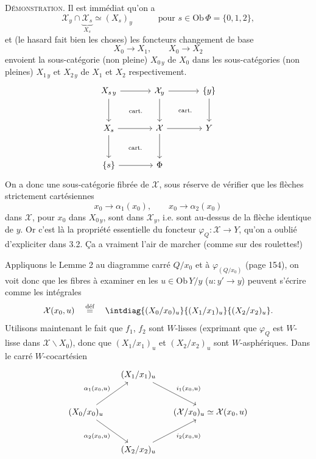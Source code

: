 \noindent\textsc{Démonstration.} Il est immédiat qu'on a
\[
\mathcal{X}_y\cap\underbrace{\mathcal{X}_s}_{X_s}\simeq(X_s)_y \qquad\quad \text{pour } s\in\mathrm{Ob}\,\Phi=\{0,1,2\},
\]
et (le hasard fait bien les choses) les foncteurs changement de base
\[
X_0\longrightarrow X_1, \qquad X_0\longrightarrow X_2
\]
envoient la sous-catégorie (non pleine) $X_{0\,y}$ de $X_0$ dans les sous-catégories (non pleines) $X_{1\,y}$ et $X_{2\,y}$ de $X_1$ et $X_2$ respectivement.
\[
\begin{tikzcd}[row sep=large,column sep=large]
X_{s\,y} \arrow[r] \arrow[d] \arrow[dr, phantom, "\scriptstyle\text{cart.}"] & \mathcal{X}_y \arrow[r] \arrow[d] \arrow[dr, phantom, "\scriptstyle\text{cart.}"] & \{y\} \arrow[d] \\
X_s \arrow[r] \arrow[d] \arrow[dr, phantom, "\scriptstyle\text{cart.}"] & \mathcal{X} \arrow[r] \arrow[d] & Y \\
\{s\} \arrow[r] & \Phi &
\end{tikzcd}
\]
On a donc une sous-catégorie fibrée de $\mathcal{X}$, sous réserve de vérifier que les flèches strictement cartésiennes
\[
x_0\longrightarrow\alpha_1(x_0), \qquad x_0\longrightarrow\alpha_2(x_0)
\]
dans $\mathcal{X}$, pour $x_0$ dans $X_{0\,y}$, sont dans $\mathcal{X}_y$, i.e. sont au-dessus de la flèche identique de $y$. Or c'est là la propriété essentielle
du foncteur $\varphi_Q : \mathcal{X}\longrightarrow Y$, qu'on a oublié d'expliciter dans 3.2. Ça a vraiment l'air de marcher (comme sur des roulettes!)

Appliquons le Lemme 2 au diagramme carré $Q/x_0$ et à $\varphi_{(Q/x_0)}$ (page 154), on voit donc que les fibres à examiner en les $u\in\mathrm{Ob}\,Y/y$ ($u : y'\longrightarrow y$) peuvent s'écrire comme les intégrales
\[
\mathcal{X}(x_0,u) \quad\overset{\text{déf}}{=}\quad \intdiag{(X_0/x_0)_u}{(X_1/x_1)_u}{(X_2/x_2)_u} .
\]
Utilisons maintenant le fait que $f_1$, $f_2$ sont $W$-lisses (exprimant que $\varphi_Q$ est $W$-lisse dans $\mathcal{X}\backslash X_0$), donc que $(X_1/x_1)_u$ et $(X_2/x_2)_u$ sont $W$-asphériques. Dans le carré $W$-cocartésien
\[
\begin{tikzcd}[row sep=large,column sep=small]
 & (X_1/x_1)_u \arrow[dr, "{i_1(x_0,u)}"] & \\
(X_0/x_0)_u \arrow[ur, "{\alpha_1(x_0,u)}"] \arrow[dr, "{\alpha_2(x_0,u)}"'] & & (\mathcal{X}/x_0)_u\simeq\mathcal{X}(x_0,u) \\
 & (X_2/x_2)_u \arrow[ur, "{i_2(x_0,u)}"'] &
\end{tikzcd}
\]

